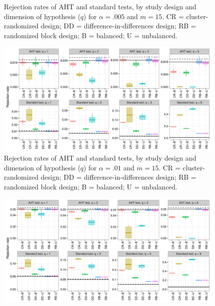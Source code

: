 \documentclass{article}\usepackage[]{graphicx}\usepackage[]{color}
\newenvironment{knitrout}{}{} %
\begin{document}
\begin{landscape}
\begin{knitrout}
\begin{figure}[H]
{}

\caption[Rejection rates of AHT and standard tests, by study design and dimension of hypothesis (]{Rejection rates of AHT and standard tests, by study design and dimension of hypothesis ($q$) for $\alpha = .005$ and $m = 15$. CR = cluster-randomized design; DD = difference-in-differences design; RB = randomized block design; B = balanced; U = unbalanced.}\label{fig:balance_005_15}
\end{figure}


\end{knitrout}

\begin{knitrout}
\color{fgcolor}\begin{figure}[H]

{\centering \includegraphics[width=\linewidth]{CR_fig/balance_01_15-1} 

}

\caption[Rejection rates of AHT and standard tests, by study design and dimension of hypothesis (]{Rejection rates of AHT and standard tests, by study design and dimension of hypothesis ($q$) for $\alpha = .01$ and $m = 15$. CR = cluster-randomized design; DD = difference-in-differences design; RB = randomized block design; B = balanced; U = unbalanced.}\label{fig:balance_01_15}
\end{figure}


\end{knitrout}

\begin{knitrout}
\color{fgcolor}\begin{figure}[H]

{\centering \includegraphics[width=\linewidth]{CR_fig/balance_05_15-1} 

}
\end{figure}
\end{knitrout}
\end{landscape}
\end{document}
